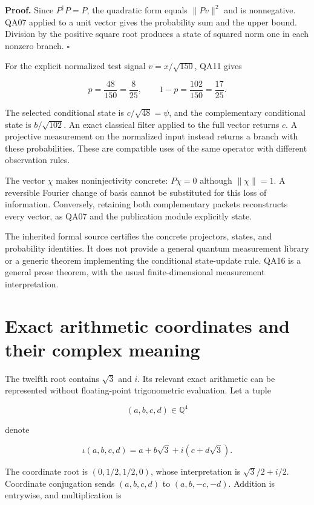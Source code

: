 \textbf{Proof.} Since \(P^\dagger P=P\), the quadratic form equals
\(\|Pv\|^2\) and is nonnegative. QA07 applied to a unit vector gives the
probability sum and the upper bound. Division by the positive square
root produces a state of squared norm one in each nonzero branch.
\(\square\)

For the explicit normalized test signal \(v=x/\sqrt{150}\), QA11 gives

\[
p=\frac{48}{150}=\frac8{25},
\qquad 1-p=\frac{102}{150}=\frac{17}{25}.
\]

The selected conditional state is \(c/\sqrt{48}=\psi\), and the
complementary conditional state is \(b/\sqrt{102}\). An exact classical
filter applied to the full vector returns \(c\). A projective
measurement on the normalized input instead returns a branch with these
probabilities. These are compatible uses of the same operator with
different observation rules.

The vector \(\chi\) makes noninjectivity concrete: \(P\chi=0\) although
\(\|\chi\|=1\). A reversible Fourier change of basis cannot be
substituted for this loss of information. Conversely, retaining both
complementary packets reconstructs every vector, as QA07 and the
publication module explicitly state.

The inherited formal source certifies the concrete projectors, states,
and probability identities. It does not provide a general quantum
measurement library or a generic theorem implementing the conditional
state-update rule. QA16 is a general prose theorem, with the usual
finite-dimensional measurement interpretation.

\hypertarget{exact-arithmetic-coordinates-and-their-complex-meaning}{%
\section{Exact arithmetic coordinates and their complex
meaning}\label{exact-arithmetic-coordinates-and-their-complex-meaning}}

The twelfth root contains \(\sqrt3\) and \(i\). Its relevant exact
arithmetic can be represented without floating-point trigonometric
evaluation. Let a tuple

\[
(a,b,c,d)\in\mathbb Q^4
\]

denote

\[
\iota(a,b,c,d)=a+b\sqrt3+i(c+d\sqrt3).
\]

The coordinate root is \((0,1/2,1/2,0)\), whose interpretation is
\(\sqrt3/2+i/2\). Coordinate conjugation sends \((a,b,c,d)\) to
\((a,b,-c,-d)\). Addition is entrywise, and multiplication is

